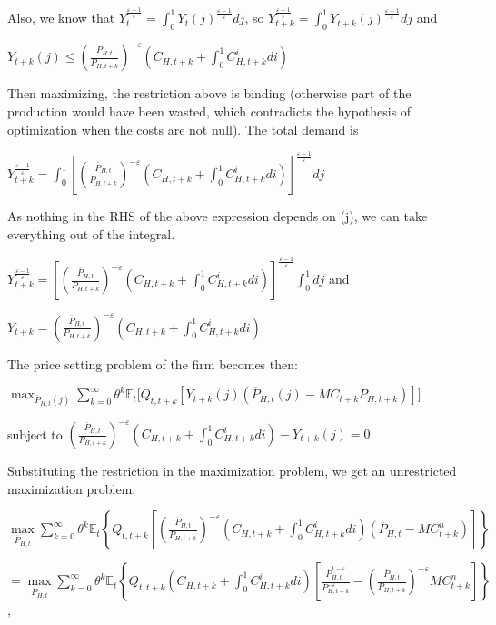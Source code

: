 \documentclass[
]{article}
\begin{document}
Also, we know that
\(\displaystyle Y_t^{\frac{\varepsilon-1}{\varepsilon}} = \int_0^1Y_t(j)^{\frac{\varepsilon-1}{\varepsilon}}dj\),
so
\(\displaystyle Y_{t+k}^{\frac{\varepsilon-1}{\varepsilon}} = \int_0^1Y_{t+k}(j)^{\frac{\varepsilon-1}{\varepsilon}}dj\)
and

\(\displaystyle Y_{t+k}(j) \leq \left( \frac{\overline{P}_{H,t}}{P_{H,t+k}} \right)^{-\varepsilon} \left( C_{H,t+k}+\int_0^1C_{H,t+k}^i di\right)\)

Then maximizing, the restriction above is binding (otherwise part of the
production would have been wasted, which contradicts the hypothesis of
optimization when the costs are not null). The total demand is

\(\displaystyle Y_{t+k}^{\frac{\varepsilon-1}{\varepsilon}} = \int_0^1 \left[ \left( \frac{\overline{P}_{H,t}}{P_{H,t+k}} \right)^{-\varepsilon} \left( C_{H,t+k}+\int_0^1C_{H,t+k}^i di\right) \right]^{\frac{\varepsilon-1}{\varepsilon}} dj\)

As nothing in the RHS of the above expression depends on (j), we can
take everything out of the integral.

\(\displaystyle Y_{t+k}^{\frac{\varepsilon-1}{\varepsilon}} = \left[ \left( \frac{\overline{P}_{H,t}}{P_{H,t+k}} \right)^{-\varepsilon} \left( C_{H,t+k}+\int_0^1C_{H,t+k}^i di\right) \right]^{\frac{\varepsilon-1}{\varepsilon}} \int_0^1 dj\)
and

\(\displaystyle Y_{t+k} = \left( \frac{\overline{P}_{H,t}}{P_{H,t+k}} \right)^{-\varepsilon} \left( C_{H,t+k}+\int_0^1C_{H,t+k}^i di\right)\)

The price setting problem of the firm becomes then:

\(\displaystyle \max_{\overline P_{H,t}(j)} \sum^\infty_{k=0} \theta^k \mathbb{E}_t \big[ Q_{t, t+k}[Y_{t+k}(j) (\overline P_{H,t}(j) - MC_{t+k} P_{H,t+k})] \big]\)

subject to
\(\displaystyle \left( \frac{\overline{P}_{H,t}}{P_{H,t+k}} \right)^{-\varepsilon} \left( C_{H,t+k}+\int_0^1C_{H,t+k}^i di\right)-Y_{t+k}(j) = 0\)

Substituting the restriction in the maximization problem, we get an
unrestricted maximization problem.

\(\displaystyle \underset{\overline{P}_{H,t}} \max \sum_{k=0}^\infty \theta^k\mathbb{E}_t \left\{Q_{t,t+k} \left[ \left( \frac{\overline{P}_{H,t}}{P_{H,t+k}} \right)^{-\varepsilon} \left( C_{H,t+k}+\int_0^1C_{H,t+k}^i di\right) (\overline{P}_{H,t}-MC_{t+k}^n) \right] \right\}\)

\(=\displaystyle \underset{\overline{P}_{H,t}} \max \sum_{k=0}^\infty \theta^k\mathbb{E}_t \left\{Q_{t,t+k} \left( C_{H,t+k}+\int_0^1C_{H,t+k}^i di\right) \left[\frac{\overline{P}_{H,t}^{1-\varepsilon}}{P_{H,t+k}^{-\varepsilon}} -\left( \frac{\overline{P}_{H,t}}{P_{H,t+k}} \right)^{-\varepsilon} MC_{t+k}^n \right] \right\}\),
\end{document}
